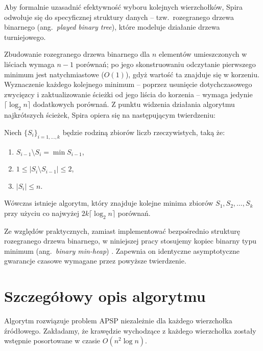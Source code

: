 Aby formalnie uzasadnić efektywność wyboru kolejnych wierzchołków, Spira odwołuje się do specyficznej struktury danych -- tzw.\ rozegranego drzewa binarnego (ang.\ \emph{played binary tree}), które modeluje działanie drzewa turniejowego.

Zbudowanie rozegranego drzewa binarnego dla $n$ elementów umieszczonych w liściach wymaga $n-1$ porównań; po jego skonstruowaniu odczytanie pierwszego minimum jest natychmiastowe ($O(1)$), gdyż wartość ta znajduje się w korzeniu. Wyznaczenie każdego kolejnego minimum -- poprzez usunięcie dotychczasowego zwycięzcy i zaktualizowanie ścieżki od jego liścia do korzenia -- wymaga jedynie $\lceil \log_2 n \rceil$ dodatkowych porównań. Z punktu widzenia działania algorytmu najkrótszych ścieżek, Spira opiera się na następującym twierdzeniu:

\begin{twierdzenie}
Niech $\{S_i\}_{i=1,\ldots,k}$ będzie rodziną zbiorów liczb rzeczywistych, taką że:
\begin{enumerate}
  \item[(a)] $S_{i-1} \setminus S_i = \min S_{i-1}$,
  \item[(b)] $1 \leq |S_i \setminus S_{i-1}| \leq 2$,
  \item[(c)] $|S_i| \leq n$.
\end{enumerate}
Wówczas istnieje algorytm, który znajduje kolejne minima zbiorów $S_1, S_2, \ldots, S_k$ przy użyciu co najwyżej $2k \lceil \log_2 n \rceil$ porównań.
\end{twierdzenie}

Ze względów praktycznych, zamiast implementować bezpośrednio strukturę rozegranego drzewa binarnego, w niniejszej pracy stosujemy kopiec binarny typu minimum (ang.\ \emph{binary min-heap}) \cite{Cormen}. Zapewnia on identyczne asymptotyczne gwarancje czasowe wymagane przez powyższe twierdzenie.

\section{Szczegółowy opis algorytmu}

Algorytm rozwiązuje problem APSP niezależnie dla każdego wierzchołka źródłowego. Zakładamy, że krawędzie wychodzące z każdego wierzchołka zostały wstępnie posortowane w czasie $O(n^2 \log n)$.

